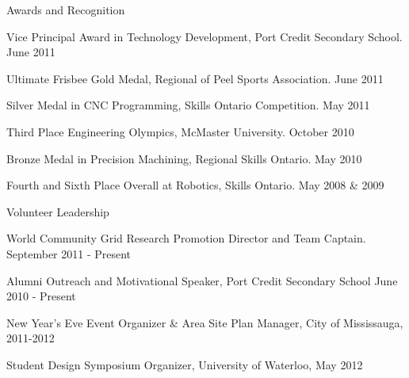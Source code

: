 \documentclass{resume} %
\begin{document}
\begin{rSection}{Awards and Recognition}
\item Vice Principal Award in Technology Development, Port Credit Secondary School. June 2011
\item Ultimate Frisbee Gold Medal, Regional of Peel Sports Association. June 2011
\item Silver Medal in CNC Programming, Skills Ontario Competition. May 2011
\item Third Place Engineering Olympics, McMaster University. October 2010
\item Bronze Medal in Precision Machining, Regional Skills Ontario. May 2010
\item Fourth and Sixth Place Overall at Robotics, Skills Ontario. May 2008 \& 2009
\end{rSection}


\begin{rSection}{Volunteer Leadership}
\item World Community Grid Research Promotion Director and Team Captain. September 2011 - Present
\item Alumni Outreach and Motivational Speaker, Port Credit Secondary School June 2010 - Present
\item New Year's Eve Event Organizer \& Area Site Plan Manager, City of Mississauga, 2011-2012
\item Student Design Symposium Organizer, University of Waterloo, May 2012

\end{rSection}
\end{document}
